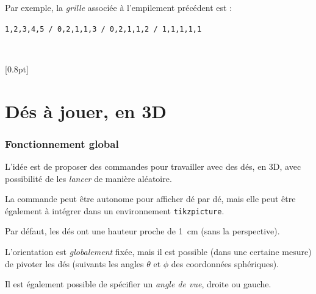 \documentclass[french,a4paper,11pt]{article}
\begin{document}
\begin{importantblock}
Par exemple, la \textit{grille} associée à l'empilement précédent est :

\smallskip

\hfill\texttt{1,2,3,4,5 / 0,2,1,1,3 / 0,2,1,1,2 / 1,1,1,1,1}\hfill~
\end{importantblock}

\vfill~

\begin{PresCode}{}
\begin{EmpilementCubes}
\end{EmpilementCubes}
\end{PresCode}

\begin{PresCode}{}
\end{PresCode}

\begin{PresCode}{}
\begin{EmpilementCubes}[2]
	[0.8pt]
\end{EmpilementCubes}
\end{PresCode}

\newpage

\part{Dés à jouer, en 3D}

\section{Fonctionnement global}

\begin{tipblock}
L'idée est de proposer des commandes pour travailler avec des dés, en 3D, avec possibilité de les \textit{lancer} de manière aléatoire.

\smallskip

La commande peut être autonome pour afficher dé par dé, mais elle peut être également à intégrer dans un environnement \texttt{tikzpicture}.
\end{tipblock}

\begin{importantblock}
Par défaut, les dés ont une hauteur proche de 1~cm (sans la perspective).

\smallskip

L'orientation est \textit{globalement} fixée, mais il est possible (dans une certaine mesure) de pivoter les dés (suivants les angles $\theta$ et $\phi$ des coordonnées sphériques).

\smallskip

Il est également possible de spécifier un \textit{angle de vue}, droite ou gauche.
\end{importantblock}
\end{document}
